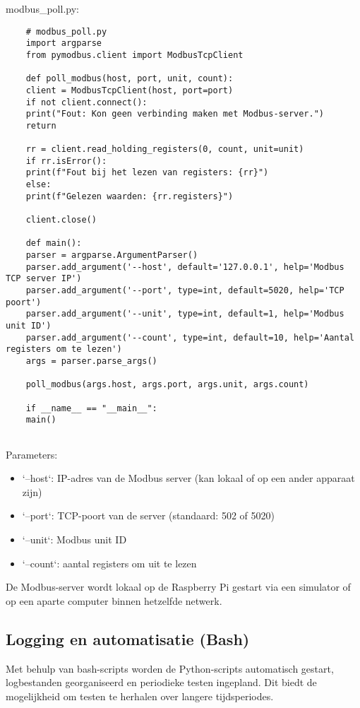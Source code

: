 modbus\_poll.py:
\begin{verbatim}
    # modbus_poll.py
    import argparse
    from pymodbus.client import ModbusTcpClient
    
    def poll_modbus(host, port, unit, count):
    client = ModbusTcpClient(host, port=port)
    if not client.connect():
    print("Fout: Kon geen verbinding maken met Modbus-server.")
    return
    
    rr = client.read_holding_registers(0, count, unit=unit)
    if rr.isError():
    print(f"Fout bij het lezen van registers: {rr}")
    else:
    print(f"Gelezen waarden: {rr.registers}")
    
    client.close()
    
    def main():
    parser = argparse.ArgumentParser()
    parser.add_argument('--host', default='127.0.0.1', help='Modbus TCP server IP')
    parser.add_argument('--port', type=int, default=5020, help='TCP poort')
    parser.add_argument('--unit', type=int, default=1, help='Modbus unit ID')
    parser.add_argument('--count', type=int, default=10, help='Aantal registers om te lezen')
    args = parser.parse_args()
    
    poll_modbus(args.host, args.port, args.unit, args.count)
    
    if __name__ == "__main__":
    main()
    
\end{verbatim}

Parameters:
\begin{itemize}
    \item `--host`: IP-adres van de Modbus server (kan lokaal of op een ander apparaat zijn)
    \item `--port`: TCP-poort van de server (standaard: 502 of 5020)
    \item `--unit`: Modbus unit ID
    \item `--count`: aantal registers om uit te lezen
\end{itemize}

De Modbus-server wordt lokaal op de Raspberry Pi gestart via een simulator of op een aparte computer binnen hetzelfde netwerk.

\subsection{Logging en automatisatie (Bash)}

Met behulp van bash-scripts worden de Python-scripts automatisch gestart, logbestanden georganiseerd en periodieke testen ingepland. Dit biedt de mogelijkheid om testen te herhalen over langere tijdsperiodes.

